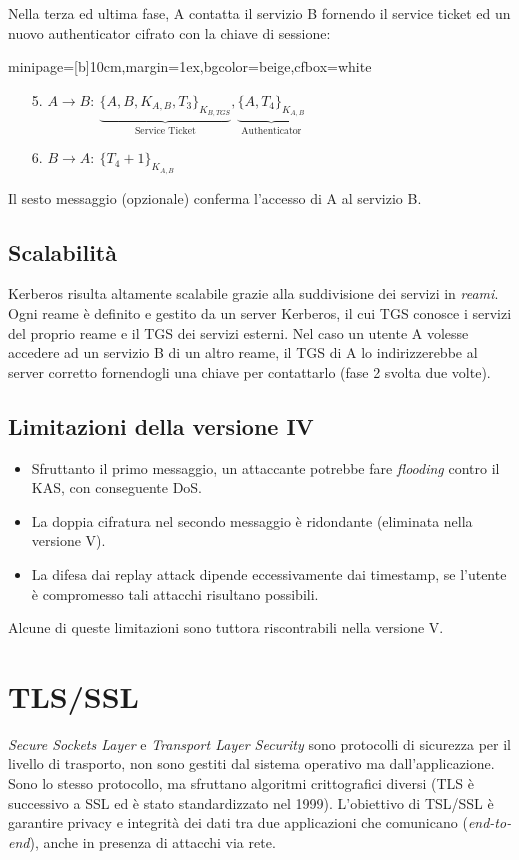 \documentclass[a4paper, 11pt, twoside, openright, fleqn]{report}
\newcommand{\fromto}[2]{#1\rightarrow #2\!:\ }
\newenvironment{colbox}[2]%
{%
	\par\noindent\hspace{10pt}
	\begin{adjustbox}{minipage=[b]{#2},margin=1ex,bgcolor=#1,cfbox=white}
}{%
	\end{adjustbox}\newline%
}
\begin{document}
Nella terza ed ultima fase, A contatta il servizio B fornendo il service ticket ed un nuovo authenticator cifrato con la chiave di sessione:
\begin{colbox}{beige}{10cm}
	\begin{enumerate}
		\item[5.] $\fromto{A}{B}\underbrace{\{A,B,K_{A,B},T_3\}_{K_{B,T\!G\!S}}}_{\mbox{Service Ticket}}, \underbrace{\{A,T_4\}_{K_{A,B}}}_{\mbox{Authenticator}}$
		\item[6.] $\fromto{B}{A}\{T_4+1\}_{K_{A,B}}$
	\end{enumerate}
\end{colbox}
Il sesto messaggio (opzionale) conferma l'accesso di A al servizio B.

\subsection{Scalabilità}
Kerberos risulta altamente scalabile grazie alla suddivisione dei servizi in \emph{reami}. Ogni reame è definito e gestito da un server Kerberos, il cui TGS conosce i servizi del proprio reame e il TGS dei servizi esterni. Nel caso un utente A volesse accedere ad un servizio B di un altro reame, il TGS di A lo indirizzerebbe al server corretto fornendogli una chiave per contattarlo (fase 2 svolta due volte).

\subsection{Limitazioni della versione IV}
\begin{itemize}
	\item Sfruttanto il primo messaggio, un attaccante potrebbe fare \emph{flooding} contro il KAS, con conseguente DoS.
	\item La doppia cifratura nel secondo messaggio è ridondante (eliminata nella versione V).
	\item La difesa dai replay attack dipende eccessivamente dai timestamp, se l'utente è compromesso tali attacchi risultano possibili.
\end{itemize}
Alcune di queste limitazioni sono tuttora riscontrabili nella versione V.


\section{TLS/SSL}
\emph{Secure Sockets Layer} e \emph{Transport Layer Security} sono protocolli di sicurezza per il livello di trasporto, non sono gestiti dal sistema operativo ma dall'applicazione. Sono lo stesso protocollo, ma sfruttano algoritmi crittografici diversi (TLS è successivo a SSL ed è stato standardizzato nel 1999).
L'obiettivo di TSL/SSL è garantire privacy e integrità dei dati tra due applicazioni che comunicano (\emph{end-to-end}), anche in presenza di attacchi via rete.
\end{document}
